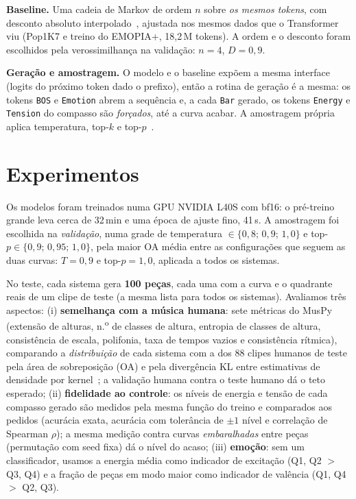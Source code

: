 \documentclass{article}
\begin{document}
\textbf{Baseline.} Uma cadeia de Markov de ordem $n$ sobre \emph{os mesmos tokens}, com desconto absoluto interpolado~\cite{ney1994}, ajustada nos mesmos dados que o Transformer viu (Pop1K7 e treino do EMOPIA+, 18,2\,M tokens). A ordem e o desconto foram escolhidos pela verossimilhança na validação: $n=4$, $D=0{,}9$.

\textbf{Geração e amostragem.} O modelo e o baseline expõem a mesma interface (logits do próximo token dado o prefixo), então a rotina de geração é a mesma: os tokens \texttt{BOS} e \texttt{Emotion} abrem a sequência e, a cada \texttt{Bar} gerado, os tokens \texttt{Energy} e \texttt{Tension} do compasso são \emph{forçados}, até a curva acabar. A amostragem própria aplica temperatura, top-$k$ e top-$p$~\cite{holtzman2020}.

\section{Experimentos}\label{sec:experimentos}

Os modelos foram treinados numa GPU NVIDIA L40S com bf16: o pré-treino grande leva cerca de 32\,min e uma época de ajuste fino, 41\,s. A amostragem foi escolhida na \emph{validação}, numa grade de temperatura $\in\{0{,}8;\,0{,}9;\,1{,}0\}$ e top-$p\in\{0{,}9;\,0{,}95;\,1{,}0\}$, pela maior OA média entre as configurações que seguem as duas curvas: $T=0{,}9$ e top-$p=1{,}0$, aplicada a todos os sistemas.

No teste, cada sistema gera \textbf{100 peças}, cada uma com a curva e o quadrante reais de um clipe de teste (a mesma lista para todos os sistemas). Avaliamos três aspectos:
(i) \textbf{semelhança com a música humana}: sete métricas do MusPy (extensão de alturas, n.\textsuperscript{o} de classes de altura, entropia de classes de altura, consistência de escala, polifonia, taxa de tempos vazios e consistência rítmica), comparando a \emph{distribuição} de cada sistema com a dos 88 clipes humanos de teste pela área de sobreposição (OA) e pela divergência KL entre estimativas de densidade por kernel~\cite{yang2020evaluation}; a validação humana contra o teste humano dá o teto esperado;
(ii) \textbf{fidelidade ao controle}: os níveis de energia e tensão de cada compasso gerado são medidos pela mesma função do treino e comparados aos pedidos (acurácia exata, acurácia com tolerância de $\pm1$ nível e correlação de Spearman $\rho$); a mesma medição contra curvas \emph{embaralhadas} entre peças (permutação com seed fixa) dá o nível do acaso;
(iii) \textbf{emoção}: sem um classificador, usamos a energia média como indicador de excitação (Q1, Q2 $>$ Q3, Q4) e a fração de peças em modo maior como indicador de valência (Q1, Q4 $>$ Q2, Q3).
\end{document}

